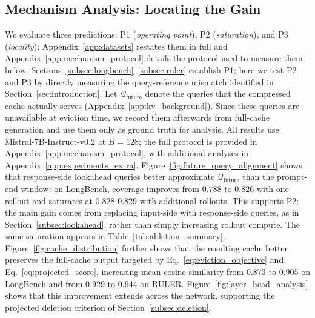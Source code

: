 \documentclass{article} %
\begin{document}
\subsection{Mechanism Analysis: Locating the Gain} \label{subsec:mechanism}
We evaluate three predictions: P1 (\emph{operating point}), P2 (\emph{saturation}), and P3 (\emph{locality}); Appendix~\ref{app:datasets} restates them in full and Appendix~\ref{app:mechanism_protocol} details the protocol used to measure them below. Sections~\ref{subsec:longbench}--\ref{subsec:ruler} establish P1; here we test P2 and P3 by directly measuring the query-reference mismatch identified in Section~\ref{sec:introduction}. Let $\mathcal{Q}_{\mathrm{future}}$ denote the queries that the compressed cache actually serves (Appendix~\ref{app:kv_background}). Since these queries are unavailable at eviction time, we record them afterwards from full-cache generation and use them only as ground truth for analysis. All results use Mistral-7B-Instruct-v0.2 at $B=128$; the full protocol is provided in Appendix~\ref{app:mechanism_protocol}, with additional analyses in Appendix~\ref{app:experiments_extra}. Figure~\ref{fig:future_query_alignment} shows that response-side lookahead queries better approximate $\mathcal{Q}_{\mathrm{future}}$ than the prompt-end window: on LongBench, coverage improves from $0.788$ to $0.826$ with one rollout and saturates at $0.828$-$0.829$ with additional rollouts. This supports P2: the main gain comes from replacing input-side with response-side queries, as in Section~\ref{subsec:lookahead}, rather than simply increasing rollout compute. The same saturation appears in Table~\ref{tab:ablation_summary}. Figure~\ref{fig:cache_distribution} further shows that the resulting cache better preserves the full-cache output targeted by Eq.~\eqref{eq:eviction_objective} and Eq.~\eqref{eq:projected_score}, increasing mean cosine similarity from $0.873$ to $0.905$ on LongBench and from $0.929$ to $0.944$ on RULER. Figure~\ref{fig:layer_head_analysis} shows that this improvement extends across the network, supporting the projected deletion criterion of Section~\ref{subsec:deletion}.
\end{document}
